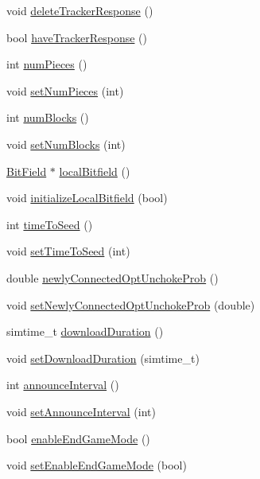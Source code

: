 \begin{DoxyCompactItemize}
\item 
void \hyperlink{classBTPeerWireBase_a1d8cafcc5310e3b28ed438908ed81e2c}{delete\+Tracker\+Response} ()
\item 
bool \hyperlink{classBTPeerWireBase_abd91bf168aa4b0deed49f7d69519620c}{have\+Tracker\+Response} ()
\item 
int \hyperlink{classBTPeerWireBase_a90058e1bc00f9b03c75823dabb6c5fc8}{num\+Pieces} ()
\item 
void \hyperlink{classBTPeerWireBase_ac543b7fce8c6e00b54db8d4dc593a912}{set\+Num\+Pieces} (int)
\item 
int \hyperlink{classBTPeerWireBase_a068ea90a8af22bee0f3078f66dbd2e3b}{num\+Blocks} ()
\item 
void \hyperlink{classBTPeerWireBase_a3f9ccbd22afd04e758478f6ad52a958b}{set\+Num\+Blocks} (int)
\item 
\hyperlink{classBitField}{Bit\+Field} $\ast$ \hyperlink{classBTPeerWireBase_af8e40ebfbd550a4cb1d767a507d95d27}{local\+Bitfield} ()
\item 
void \hyperlink{classBTPeerWireBase_acced5c7380896462f1e319dc95b849a0}{initialize\+Local\+Bitfield} (bool)
\item 
int \hyperlink{classBTPeerWireBase_a4df8bf274c9665653b47258ad68d70f1}{time\+To\+Seed} ()
\item 
void \hyperlink{classBTPeerWireBase_abc3f55145a744df1a5935b4165f11396}{set\+Time\+To\+Seed} (int)
\item 
double \hyperlink{classBTPeerWireBase_a505e20c7e80e85c2e073c4ef2a59bce1}{newly\+Connected\+Opt\+Unchoke\+Prob} ()
\item 
void \hyperlink{classBTPeerWireBase_a9cda120fc0f9b9b2f3c9346fcfb3b475}{set\+Newly\+Connected\+Opt\+Unchoke\+Prob} (double)
\item 
simtime\+\_\+t \hyperlink{classBTPeerWireBase_a6ee7db499a44c8006ff69c598919c996}{download\+Duration} ()
\item 
void \hyperlink{classBTPeerWireBase_a554668c82ae960fc241d9df04fcb3bff}{set\+Download\+Duration} (simtime\+\_\+t)
\item 
int \hyperlink{classBTPeerWireBase_a9a08a96de65ceb863067fa644a5f6fee}{announce\+Interval} ()
\item 
void \hyperlink{classBTPeerWireBase_ae174d6a8c9beaadb6f4202bbfaec5410}{set\+Announce\+Interval} (int)
\item 
bool \hyperlink{classBTPeerWireBase_a6938ee5f895636391583a3abf39417bd}{enable\+End\+Game\+Mode} ()
\item 
void \hyperlink{classBTPeerWireBase_a1bda4eaf6a7d6124024847ba1087c9c0}{set\+Enable\+End\+Game\+Mode} (bool)

\end{DoxyCompactItemize}
